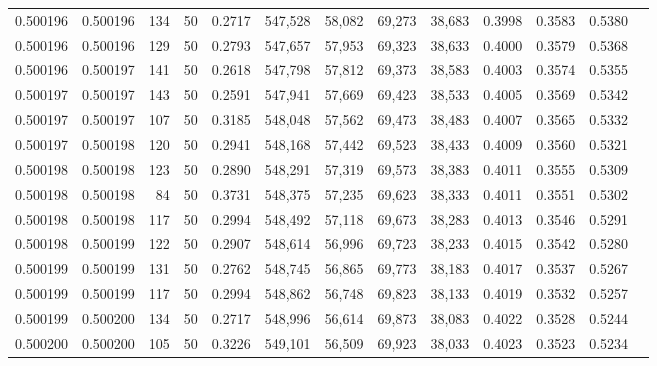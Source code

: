 \begin{tabular}{rrrrrrrrrrrrr}
0.500196 & 0.500196 &   134 &  50 &                                     0.2717 & 547,528 &  58,082 &  69,273 &  38,683 & 0.3998 & 0.3583 & 0.5380 \\
0.500196 & 0.500196 &   129 &  50 &                                     0.2793 & 547,657 &  57,953 &  69,323 &  38,633 & 0.4000 & 0.3579 & 0.5368 \\
0.500196 & 0.500197 &   141 &  50 &                                     0.2618 & 547,798 &  57,812 &  69,373 &  38,583 & 0.4003 & 0.3574 & 0.5355 \\
0.500197 & 0.500197 &   143 &  50 &                                     0.2591 & 547,941 &  57,669 &  69,423 &  38,533 & 0.4005 & 0.3569 & 0.5342 \\
0.500197 & 0.500197 &   107 &  50 &                                     0.3185 & 548,048 &  57,562 &  69,473 &  38,483 & 0.4007 & 0.3565 & 0.5332 \\
0.500197 & 0.500198 &   120 &  50 &                                     0.2941 & 548,168 &  57,442 &  69,523 &  38,433 & 0.4009 & 0.3560 & 0.5321 \\
0.500198 & 0.500198 &   123 &  50 &                                     0.2890 & 548,291 &  57,319 &  69,573 &  38,383 & 0.4011 & 0.3555 & 0.5309 \\
0.500198 & 0.500198 &    84 &  50 &                                     0.3731 & 548,375 &  57,235 &  69,623 &  38,333 & 0.4011 & 0.3551 & 0.5302 \\
0.500198 & 0.500198 &   117 &  50 &                                     0.2994 & 548,492 &  57,118 &  69,673 &  38,283 & 0.4013 & 0.3546 & 0.5291 \\
0.500198 & 0.500199 &   122 &  50 &                                     0.2907 & 548,614 &  56,996 &  69,723 &  38,233 & 0.4015 & 0.3542 & 0.5280 \\
0.500199 & 0.500199 &   131 &  50 &                                     0.2762 & 548,745 &  56,865 &  69,773 &  38,183 & 0.4017 & 0.3537 & 0.5267 \\
0.500199 & 0.500199 &   117 &  50 &                                     0.2994 & 548,862 &  56,748 &  69,823 &  38,133 & 0.4019 & 0.3532 & 0.5257 \\
0.500199 & 0.500200 &   134 &  50 &                                     0.2717 & 548,996 &  56,614 &  69,873 &  38,083 & 0.4022 & 0.3528 & 0.5244 \\
0.500200 & 0.500200 &   105 &  50 &                                     0.3226 & 549,101 &  56,509 &  69,923 &  38,033 & 0.4023 & 0.3523 & 0.5234 \\

\end{tabular}
